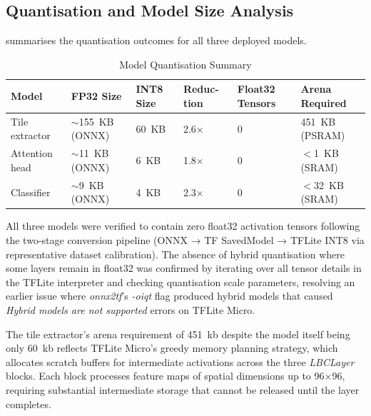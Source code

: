 \subsection{Quantisation and Model Size Analysis}
 
 summarises the quantisation outcomes for all three deployed
models.
 
\begin{table}[H]
\renewcommand{\arraystretch}{1.25}
\caption{Model Quantisation Summary}
\label{tab:quantisation}
\centering
\small
\begin{tabular}{p{2cm}p{2cm}p{1.5cm}p{1.5cm}p{1.8cm}p{2cm}}
\toprule
\textbf{Model} & 
\textbf{FP32} \newline \textbf{Size} & 
\textbf{INT8} \newline \textbf{Size} & 
\textbf{Reduc-} \newline \textbf{tion} & 
\textbf{Float32} \newline \textbf{Tensors} & 
\textbf{Arena} \newline \textbf{Required} \\
\midrule
Tile extractor  & $\sim$155~KB \newline (ONNX) & 60~KB  & 2.6$\times$ & 0 & 451~KB \newline (PSRAM)  \\
Attention head  & $\sim$11~KB \newline (ONNX)  & 6~KB   & 1.8$\times$ & 0 & $<$1~KB \newline (SRAM)  \\
Classifier      & $\sim$9~KB \newline (ONNX)   & 4~KB   & 2.3$\times$ & 0 & $<$32~KB \newline (SRAM) \\
\bottomrule
\end{tabular}
\end{table}
 
All three models were verified to contain zero float32 activation tensors following the
two-stage conversion pipeline (ONNX → TF SavedModel → TFLite INT8 via representative
dataset calibration). The absence of hybrid quantisation where some layers remain in
float32 was confirmed by iterating over all tensor details in the TFLite interpreter
and checking quantisation scale parameters, resolving an earlier issue where
\textit{onnx2tf}'s \textit{-oiqt} flag produced hybrid models that caused
\textit{Hybrid models are not supported} errors on TFLite Micro.
 
The tile extractor's arena requirement of 451~\gls{kb} despite the model itself being
only 60~\gls{kb} reflects TFLite Micro's greedy memory planning strategy, which
allocates scratch buffers for intermediate activations across the three
\textit{LBCLayer} blocks. Each block processes feature maps of spatial dimensions
up to 96×96, requiring substantial intermediate storage that cannot be released until
the layer completes.
 
